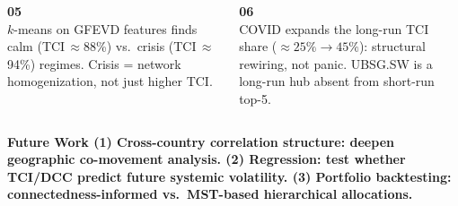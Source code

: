 \documentclass[aspectratio=169,10pt]{beamer}
\begin{document}
{\begin{frame}[plain]
\vspace{3pt}

\begin{columns}[T,onlytextwidth]
  \begin{tcolorbox}[enhanced,colback=DarkBlue,colframe=DarkBlue,
    coltext=white,boxrule=0pt,arc=3pt,
    left=5pt,right=5pt,top=3pt,bottom=3pt]
    {\color{Gold}\Large\bfseries 05}\\[2pt]
    {\scriptsize $k$-means on GFEVD features finds calm (TCI\,$\approx$88\%) vs.\ crisis (TCI\,$\approx$94\%) regimes. Crisis = network homogenization, not just higher TCI.}
  \end{tcolorbox}
  \begin{tcolorbox}[enhanced,colback=DarkBlue,colframe=DarkBlue,
    coltext=white,boxrule=0pt,arc=3pt,
    left=5pt,right=5pt,top=3pt,bottom=3pt]
    {\color{Gold}\Large\bfseries 06}\\[2pt]
    {\scriptsize COVID expands the long-run TCI share (${\approx}25\%\to45\%$): structural rewiring, not panic. UBSG.SW is a long-run hub absent from short-run top-5.}
  \end{tcolorbox}
\end{columns}


\vspace{3pt}
\begin{tcolorbox}[enhanced,colback=DarkPanel,colframe=DarkPanel,coltext=LightBlue,
  boxrule=0pt,arc=3pt,left=6pt,right=6pt,top=3pt,bottom=3pt]
  \footnotesize\color{Gold}\bfseries Future Work\enspace
  \normalfont\scriptsize\color{LightBlue}
  \textbf{(1) Cross-country correlation structure:} deepen geographic co-movement analysis.\enspace
  \textbf{(2) Regression:} test whether TCI/DCC predict future systemic volatility.\enspace
  \textbf{(3) Portfolio backtesting:} connectedness-informed vs.\ MST-based hierarchical allocations.
\end{tcolorbox}
\end{frame}
}
\end{document}

